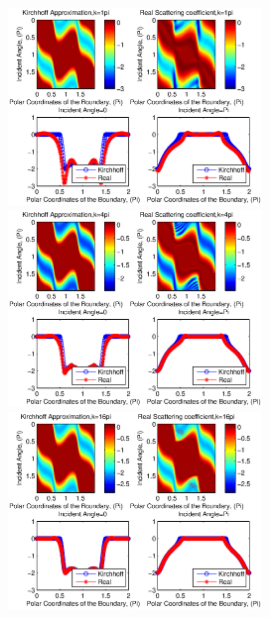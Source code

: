 \documentclass[12pt]{iopart}
\begin{document}
\begin{figure}
	\centering
	\includegraphics[width=0.6\textwidth]{./figure_sc/scattering_coefficient_kite_1.eps}
	\includegraphics[width=0.6\textwidth]{./figure_sc/scattering_coefficient_kite_4.eps}
	\includegraphics[width=0.6\textwidth]{./figure_sc/scattering_coefficient_kite_16.eps}
	\caption{}\label{kite}
\end{figure}
\end{document}
